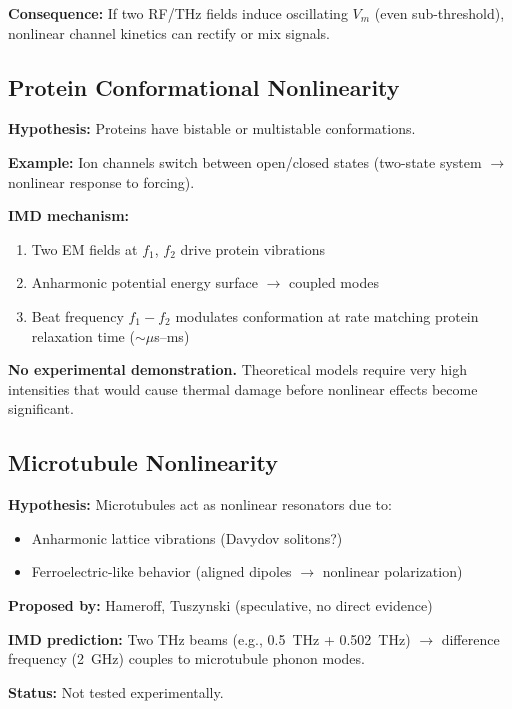\textbf{Consequence:} If two RF/THz fields induce oscillating $V_m$ (even sub-threshold), nonlinear channel kinetics can rectify or mix signals.

\subsection{Protein Conformational Nonlinearity}

\textbf{Hypothesis:} Proteins have bistable or multistable conformations.

\textbf{Example:} Ion channels switch between open/closed states (two-state system $\rightarrow$ nonlinear response to forcing).

\textbf{IMD mechanism:}
\begin{enumerate}
\item Two EM fields at $f_1$, $f_2$ drive protein vibrations
\item Anharmonic potential energy surface $\rightarrow$ coupled modes
\item Beat frequency $f_1 - f_2$ modulates conformation at rate matching protein relaxation time ($\sim\mu$s--ms)
\end{enumerate}

\begin{warningbox}
\textbf{No experimental demonstration.} Theoretical models require very high intensities that would cause thermal damage before nonlinear effects become significant.
\end{warningbox}

\subsection{Microtubule Nonlinearity}

\textbf{Hypothesis:} Microtubules act as nonlinear resonators due to:
\begin{itemize}
\item Anharmonic lattice vibrations (Davydov solitons?)
\item Ferroelectric-like behavior (aligned dipoles $\rightarrow$ nonlinear polarization)
\end{itemize}

\textbf{Proposed by:} Hameroff, Tuszynski (speculative, no direct evidence)

\textbf{IMD prediction:} Two THz beams (e.g., 0.5~THz + 0.502~THz) $\rightarrow$ difference frequency (2~GHz) couples to microtubule phonon modes.

\textbf{Status:} Not tested experimentally.

